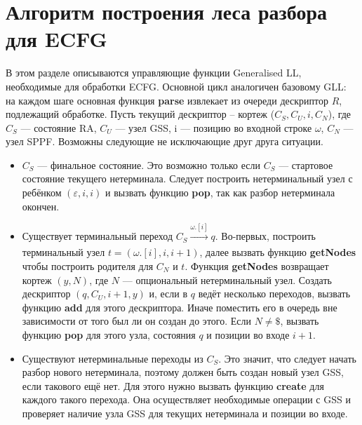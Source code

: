 \documentclass[12pt]{matmex-diploma-custom}
\begin{document}
	\section{Алгоритм построения леса разбора для ECFG}
	В этом разделе описываются управляющие функции
	Generalised LL, необходимые для обработки ECFG. Основной цикл аналогичен базовому
	GLL: на каждом шаге основная функция \textbf{parse} извлекает из очереди дескриптор
	$R$, подлежащий обработке. Пусть текущий дескриптор -- кортеж ($C_S, C_U, i, C_N$),
	где $C_S$ --- состояние RA, $C_U$ --- узел GSS, i --- позицию во входной строке 
	$\omega$, $C_N$ --- узел SPPF. Возможны следующие
	не исключающие друг друга ситуации.
	\begin{itemize} 
		\item $C_S$ --- финальное состояние. Это возможно только если $C_S$
		--- стартовое состояние текущего нетерминала. Следует построить нетерминальный
		узел с ребёнком $(\varepsilon, i, i)$ и вызвать функцию \textbf{pop}, так как
		разбор нетерминала окончен.
		
		\item Существует терминальный переход $C_S \xrightarrow[]{\omega.[i]} q$.
		Во-первых, построить терминальный узел $ t = (\omega.[i], i, i+1) $, далее 
		вызвать функцию \textbf{getNodes} чтобы построить родителя для $ C_N $ и $ t $. 
		Функция \textbf{getNodes} возвращает кортеж $ (y, N) $, где $N$ --- опциональный
		нетерминальный узел. Создать дескриптор $ (q, C_U, i+1, y) $ и, если
        в $q$ ведёт несколько переходов, вызвать функцию \textbf{add} для этого дескриптора.
        Иначе поместить его в очередь вне зависимости от того был ли он создан до этого. 
        Если $ N \neq \$$,
		вызвать функцию \textbf{pop} для этого узла, состояния $ q $ и позиции во
		входе $ i + 1 $.
		
		\item Существуют нетерминальные переходы из $C_S$.
		Это значит, что следует начать разбор нового нетерминала, поэтому должен быть
		создан новый узел GSS, если такового ещё нет. Для этого нужно вызвать функцию
		\textbf{create} для каждого такого перехода. Она осуществляет необходимые
		операции с GSS и проверяет наличие узла GSS для текущих нетерминала и 
		позиции во входе.
	\end{itemize}    
    
\end{document}
